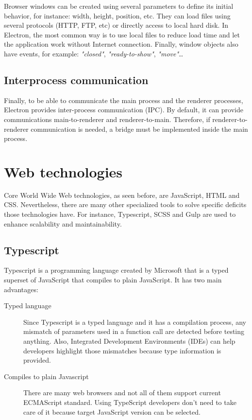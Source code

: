 Browser windows can be created using several parameters to define its initial
behavior, for instance: width, height, position, etc. They can load files  
using several protocols (HTTP, FTP, etc) or directly access to local hard disk.
In Electron, the most common way is to use local files to reduce load time and
let the application work without Internet connection. Finally, window objects
also have events, for example: \textit{"closed"}, \textit{"ready-to-show"},
\textit{"move"}\dots

\subsection{Interprocess communication}

Finally, to be able to communicate the main process and the renderer processes, 
Electron provides inter-process communication (IPC). By default, it can provide
communications main-to-renderer and renderer-to-main. Therefore, if
renderer-to-renderer communication is needed, a bridge must be implemented
inside the main process.


\section{Web technologies}

Core World Wide Web technologies, as seen before, are JavaScript, HTML and CSS.
Nevertheless, there are many other specialized tools to solve specific deficits 
those technologies have. For instance, Typescript, SCSS and Gulp are used to
enhance scalability and maintainability. 

\subsection{Typescript}

Typescript\cite{typescript-web} is a programming language created by Microsoft
that is a typed superset of JavaScript that compiles to plain JavaScript. It has
two main advantages:

\begin{description}
	\item[Typed language]
	Since Typescript is a typed language and it has a compilation process, any
	mismatch of parameters used in a function call are detected before testing
	anything. Also, Integrated Development Environments (IDEs) can help
	developers highlight those mismatches because type information is provided.
	
	\item[Compiles to plain Javascript]
	There are many web browsers and not all of them support current ECMAScript 
	standard. Using TypeScript developers don't need to take care of it because
	target JavaScript version can be selected.

\end{description}


